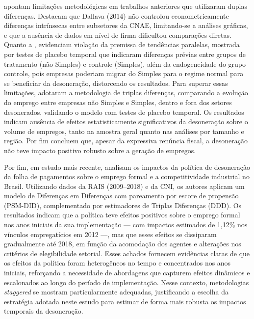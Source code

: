 \documentclass[12pt,a4paper,oneside]{article}
\begin{document}
		\citet{Garcia2018} apontam limitações metodológicas em trabalhos anteriores que utilizaram duplas diferenças. Destacam que Dallava (2014) não controlou econometricamente diferenças intrínsecas entre subsetores da CNAE, limitando-se a análises gráficas, e que a ausência de dados em nível de firma dificultou comparações diretas. Quanto a \citet{Scherer2015}, \citet{Garcia2018} evidenciam violação da premissa de tendências paralelas, mostrada por testes de placebo temporal que indicaram diferenças prévias entre grupos de tratamento (não Simples) e controle (Simples), além da endogeneidade do grupo controle, pois empresas poderiam migrar do Simples para o regime normal para se beneficiar da desoneração, distorcendo os resultados. Para superar essas limitações, \citet{Garcia2018} adotaram a metodologia de triplas diferenças, comparando a evolução do emprego entre empresas não Simples e Simples, dentro e fora dos setores desonerados, validando o modelo com testes de placebo temporal. Os resultados indicam ausência de efeitos estatisticamente significativos da desoneração sobre o volume de empregos, tanto na amostra geral quanto nas análises por tamanho e região. Por fim concluem que, apesar da expressiva renúncia fiscal, a desoneração não teve impacto positivo robusto sobre a geração de empregos.
		
		Por fim, em estudo mais recente, \citet{Freitas2022} analisam os impactos da política de desoneração da folha de pagamentos sobre o emprego formal e a competitividade industrial no Brasil. Utilizando dados da RAIS (2009–2018) e da CNI, os autores aplicam um modelo de Diferenças em Diferenças com pareamento por escore de propensão (PSM-DID), complementado por estimadores de Triplas Diferenças (DDD). Os resultados indicam que a política teve efeitos positivos sobre o emprego formal nos anos iniciais da sua implementação — com impactos estimados de 1,12\% nos vínculos empregatícios em 2012 —, mas que esses efeitos se dissiparam gradualmente até 2018, em função da acomodação dos agentes e alterações nos critérios de elegibilidade setorial. Esses achados fornecem evidências claras de que os efeitos da política foram heterogêneos no tempo e concentrados nos anos iniciais, reforçando a necessidade de abordagens que capturem efeitos dinâmicos e escalonados ao longo do período de implementação. Nesse contexto, metodologias \emph{staggered} se mostram particularmente adequadas, justificando a escolha da estratégia adotada neste estudo para estimar de forma mais robusta os impactos temporais da desoneração.
\end{document}

